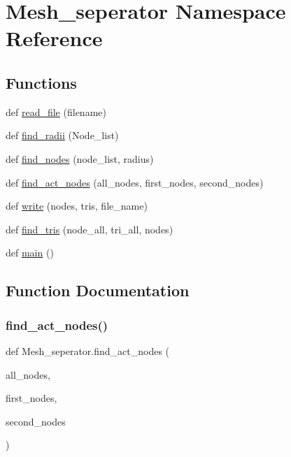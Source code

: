 \hypertarget{namespaceMesh__seperator}{}\section{Mesh\+\_\+seperator Namespace Reference}
\label{namespaceMesh__seperator}
\subsection*{Functions}
\begin{DoxyCompactItemize}
\item 
def \mbox{\hyperlink{namespaceMesh__seperator_a954c8ddb9835123773ae8dce3b1ce39c}{read\+\_\+file}} (filename)
\item 
def \mbox{\hyperlink{namespaceMesh__seperator_aff846c342f17725ec1ff053e3ebeace6}{find\+\_\+radii}} (Node\+\_\+list)
\item 
def \mbox{\hyperlink{namespaceMesh__seperator_a620490c6c76a9ea91bd73f274436796e}{find\+\_\+nodes}} (node\+\_\+list, radius)
\item 
def \mbox{\hyperlink{namespaceMesh__seperator_a11c3a46a654f77b6903d3b8426c17f63}{find\+\_\+act\+\_\+nodes}} (all\+\_\+nodes, first\+\_\+nodes, second\+\_\+nodes)
\item 
def \mbox{\hyperlink{namespaceMesh__seperator_aee9199c38a0cdb313d24163ddf413de0}{write}} (nodes, tris, file\+\_\+name)
\item 
def \mbox{\hyperlink{namespaceMesh__seperator_a46da65de297af581c00aad6ab0a4853c}{find\+\_\+tris}} (node\+\_\+all, tri\+\_\+all, nodes)
\item 
def \mbox{\hyperlink{namespaceMesh__seperator_a090bb549dd0fba0519c35b7827245122}{main}} ()
\end{DoxyCompactItemize}


\subsection{Function Documentation}
\mbox{\label{namespaceMesh__seperator_a11c3a46a654f77b6903d3b8426c17f63}} 
\subsubsection{\texorpdfstring{find\_act\_nodes()}{find\_act\_nodes()}}
{\footnotesize\ttfamily def Mesh\+\_\+seperator.\+find\+\_\+act\+\_\+nodes (\begin{DoxyParamCaption}\item[{}]{all\+\_\+nodes,  }\item[{}]{first\+\_\+nodes,  }\item[{}]{second\+\_\+nodes }\end{DoxyParamCaption})}

